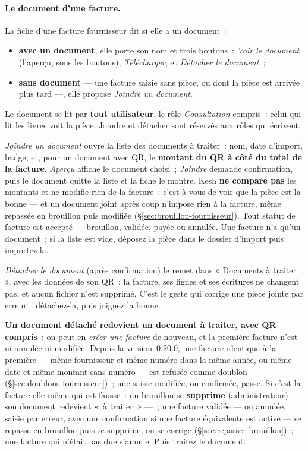 \documentclass[a4paper,11pt,oneside]{article}
\begin{document}
\paragraph{Le document d'une facture.} La fiche d'une facture fournisseur dit si elle a un
document~:
\begin{itemize}
    \item \textbf{avec un document}, elle porte son nom et trois boutons~: \emph{Voir le
          document} (l'aperçu, sous les boutons), \emph{Télécharger}, et \emph{Détacher le
          document}~;
    \item \textbf{sans document} --- une facture saisie sans pièce, ou dont la pièce est
          arrivée plus tard ---, elle propose \emph{Joindre un document}.
\end{itemize}
Le document se lit par \textbf{tout utilisateur}, le rôle \emph{Consultation} compris~:
celui qui lit les livres voit la pièce. Joindre et détacher sont réservés aux rôles qui
écrivent.

\emph{Joindre un document} ouvre la liste des documents à traiter~: nom, date d'import,
badge, et, pour un document avec QR, le \textbf{montant du QR à côté du total de la
facture}. \emph{Aperçu} affiche le document choisi~; \emph{Joindre} demande confirmation,
puis le document quitte la liste et la fiche le montre. Kesh \textbf{ne compare pas} les
montants et ne modifie rien de la facture~: c'est à vous de voir que la pièce est la
bonne --- et un document joint après coup n'impose rien à la facture, même repassée en
brouillon puis modifiée (\S\ref{sec:brouillon-fournisseur}). Tout statut de facture est accepté --- brouillon,
validée, payée ou annulée. Une facture n'a
qu'un document~; si la liste est vide, déposez la pièce dans le dossier d'import puis
importez-la.

\emph{Détacher le document} (après confirmation) le remet dans « Documents à traiter »,
avec les données de son QR~; la facture, ses lignes et ses écritures ne changent pas, et
aucun fichier n'est supprimé. C'est le geste qui corrige une pièce jointe par erreur~:
détachez-la, puis joignez la bonne.

\begin{keshwarning}
\textbf{Un document détaché redevient un document à traiter, avec QR compris}~: on peut en
\emph{créer une facture} de nouveau, et la première facture n'est ni annulée ni modifiée.
Depuis la version~0.20.0, une facture identique à la première --- même fournisseur et même
numéro dans la même année, ou même date et même montant sans numéro --- est refusée comme
doublon (\S\ref{sec:doublons-fournisseur})~; une saisie modifiée, ou confirmée, passe. Si c'est la facture elle-même qui est fausse~: un brouillon se
\textbf{supprime} (administrateur) --- son document redevient «~à traiter~» ---~; une facture
validée --- ou annulée, saisie par erreur, avec une confirmation si une facture équivalente est
active --- se repasse en brouillon puis se supprime, ou se corrige
(\S\ref{sec:repasser-brouillon})~; une facture qui n'était pas due s'annule. Puis traitez le
document.
\end{keshwarning}
\end{document}
